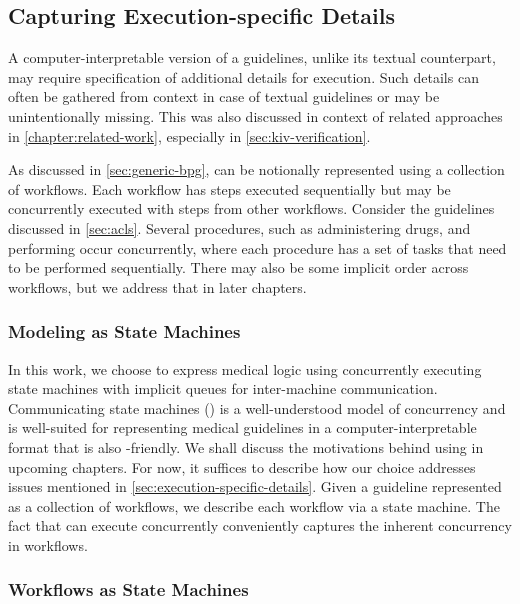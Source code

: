 \subsection{Capturing Execution-specific Details}\label{sec:execution-specific-details}

A computer-interpretable version of a guidelines, unlike its
textual counterpart, may require specification of additional details
for execution. Such details can often be gathered from context in case
of textual guidelines or may be unintentionally missing. This was also
discussed in context of related approaches in \autoref{chapter:related-work},
especially in \autoref{sec:kiv-verification}.

As discussed in \autoref{sec:generic-bpg}, \BPGs{} can be notionally
represented using a collection of workflows. Each workflow has steps
executed sequentially but may be concurrently executed with steps from
other workflows. Consider the \ACLS{} guidelines discussed in
\autoref{sec:acls}. Several procedures, such as administering drugs,
and performing \CPR{} occur concurrently, where each procedure has
a set of tasks that need to be performed sequentially.
There may also be some implicit order across workflows, but we
address that in later chapters.

\subsubsection{Modeling \BPGs{} as State Machines}

In this work, we choose to express medical logic using
concurrently executing state machines with implicit queues for inter-machine communication.
Communicating state machines (\CSMs{}) is a well-understood model of concurrency
\cite{BrandJACM83} and is well-suited for representing medical guidelines in a
computer-interpretable format that is also \HCP{}-friendly.
We shall discuss the motivations behind using \CSMs{} in upcoming
chapters. For now, it suffices to describe how our choice addresses
issues mentioned in \autoref{sec:execution-specific-details}.
Given a guideline represented as a collection of workflows, we
describe each workflow via a state machine. The fact that
\CSMs{} can execute concurrently conveniently captures the
inherent concurrency in workflows.

\subsubsection{\ACLS{} Workflows as State Machines}

